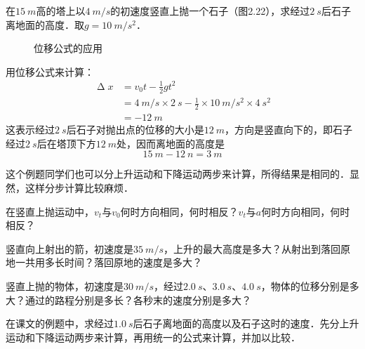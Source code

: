 \begin{Example}
    在$\qty{15}{m}$高的塔上以$\qty{4}{m/s}$的初速度竖直上抛一个石子（图2.22），求经过$\qty{2}{s}$后石子离地面的高度．取$g=\qty{10}{m/s^2}$．
\end{Example}

\begin{figure}[H]
    \centering
    \caption{位移公式的应用}
\end{figure}

\begin{Answer}
    用位移公式来计算：
    \[\begin{split}
            \upDelta x & =v_0 t-\frac{1}{2}gt^2                                                                \\
                       & =\qty{4}{m/s} \times \qty{2}{s}-\frac{1}{2}\times \qty{10}{m/s^2} \times \qty{4}{s^2} \\
                       & =\qty{-12}{m}
        \end{split} \]
    这表示经过$\qty{2}{s}$后石子对抛出点的位移的大小是$\qty{12}{m}$，方向是竖直向下的，即石子经过$\qty{2}{s}$后在塔顶下方$\qty{12}{m}$处，因而离地面的高度是
    \[\qty{15}{m}-\qty{12}{n}=\qty{3}{m}\]
\end{Answer}

这个例题同学们也可以分上升运动和下降运动两步来计算，所得结果是相同的．显然，这样分步计算比较麻烦．

\begin{Exercise}
	\begin{QsNum}
	    \item 在竖直上抛运动中，$v_t$与$v_0$何时方向相同，何时相反？$v_t$与$a$何时方向相同，何时相反？
	    \item 竖直向上射出的箭，初速度是$\qty{35}{m/s}$，上升的最大高度是多大？从射出到落回原地一共用多长时间？落回原地的速度是多大？
	    \item 竖直上抛的物体，初速度是$\qty{30}{m/s}$，经过$\qty{2.0}{s}$、$\qty{3.0}{s}$、$\qty{4.0}{s}$，物体的位移分别是多大？通过的路程分别是多长？各秒末的速度分别是多大？
	    \item 在课文的例题中，求经过$\qty{1.0}{s}$后石子离地面的高度以及石子这时的速度．先分上升运动和下降运动两步来计算，再用统一的公式来计算，并加以比较．
	\end{QsNum}
\end{Exercise}




